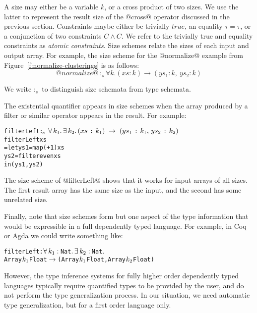 A size may either be a variable $k$, or a cross product of two sizes. We use the latter to represent the result size of the @cross@ operator discussed in the previous section. Constraints maybe either be trivially $true$, an equality $\tau = \tau$, or a conjunction of two constraints $C \wedge C$. We refer to the trivially true and equality constraints as \emph{atomic constraints}. Size schemes relate the sizes of each input and output array. For example, the size scheme for the @normalize@ example from Figure~\ref{f:normalize-clusterings} is as follows:
$$@normalize@ ~:_s \forall k. (xs : k) \to (ys_1 : k,~ ys_2 : k)
$$

We write $:_s$ to distinguish size schemata from type schemata.

The existential quantifier appears in size schemes when the array produced by a filter or similar operator appears in the result. For example:
\begin{alltt}
   filterLeft \(:\sb{s}\,\forall\,k\sb{1}.\,\exists\,k\sb{2}.\,(xs\,:\,k\sb{1})\;\to\;(ys\sb{1}\,:\,k\sb{1},\,ys\sb{2}\,:\,k\sb{2})\)
   filterLeft xs
     = let ys1 = map (+ 1)   xs
           ys2 = filter even xs
       in (ys1, ys2)
\end{alltt}

The size scheme of @filterLeft@ shows that it works for input arrays of all sizes. The first result array has the same size as the input, and the second has some unrelated size.

Finally, note that size schemes form but one aspect of the type information that would be expressible in a full dependently typed language. For example, in Coq or Agda we could write something like:
\begin{alltt}
filterLeft : \(\forall\,k\sb{1}:\,\)Nat\(.\,\exists\,k\sb{2}:\,\)Nat\(.\) 
  Array \(k\sb{1}\) Float \(\to\) (Array \(k\sb{1}\) Float, Array \(k\sb{2}\) Float)
\end{alltt}

However, the type inference systems for fully higher order dependently typed languages typically require quantified types to be provided by the user, and do not perform the type generalization process. In our situation, we need automatic type generalization, but for a first order language only.


